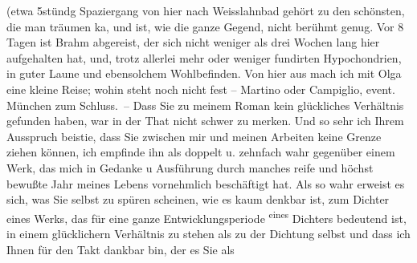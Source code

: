 \begin{ledgroupsized}[t]{13cm}
               (etwa 5stündg Spaziergang von hier nach Weisslahnbad gehört zu {\pb}den schönsten, die man
               träumen ka{\geminationn}, und ist, wie die ganze Gegend, nicht
               berühmt genug. Vor 8 Tagen ist Brahm abgereist,
               der sich nicht weniger als drei Wochen lang hier aufgehalten hat, und, trotz allerlei
               mehr oder weniger fundirten Hypochondrien, in guter Laune und ebensolchem
               Wohlbefinden.\pend
           \pstart
           Von hier aus mach ich mit Olga eine kleine Reise;
               wohin steht noch nicht fest – Martino oder Campiglio, event. München zum Schluss. – Dass Sie zu {\pb}meinem Roman kein glückliches Verhältnis
               gefunden haben, war in der That nicht schwer zu merken. Und so sehr ich Ihrem
               Ausspruch beisti{\geminationm}e, dass Sie zwischen mir und meinen
               Arbeiten keine Grenze ziehen können, ich empfinde ihn als doppelt u. zehnfach wahr
               gegenüber einem Werk, das mich in Gedanke u Ausführung durch manches reife und \introOben{}höchst\introOben{} bewußte Jahr meines Lebens vornehmlich beschäftigt hat.
               Als so wahr erweist es sich, was Sie selbst zu spüren scheinen, wie es kaum denkbar
               ist, zum Dichter eines Werks, das für eine {\pb}ganze
               Entwicklungsperiode \substVorne{}\textsuperscript{eines}\substDazwischen{}\label{T_L01786_1v}\label{T_L01786_1h}\substHinten{} Dichters bedeutend ist, in einem glücklichern Verhältnis zu stehen als zu
               der Dichtung selbst und dass ich Ihnen für den Takt dankbar bin, der es Sie als

\end{ledgroupsized}
